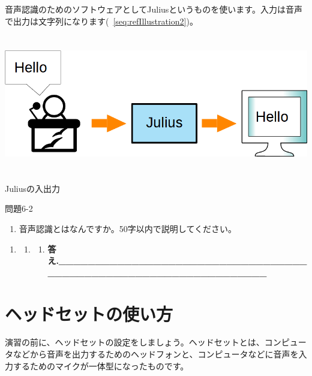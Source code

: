 \documentclass[a4paper,dvipdfmx]{jarticle}
\newcommand\liststyleLii{%
\renewcommand\theenumi{\arabic{enumi}}
\renewcommand\theenumii{\arabic{enumii}}
\renewcommand\theenumiii{\arabic{enumiii}}
\renewcommand\theenumiv{\arabic{enumiv}}
\renewcommand\labelenumi{\theenumi.}
\renewcommand\labelenumii{\theenumii.}
\renewcommand\labelenumiii{\theenumiii.}
\renewcommand\labelenumiv{\theenumiv.}
}
\newcommand\liststyleLiii{%
\renewcommand\theenumi{\arabic{enumi}}
\renewcommand\theenumii{\arabic{enumii}}
\renewcommand\theenumiii{\arabic{enumiii}}
\renewcommand\theenumiv{\arabic{enumiv}}
\renewcommand\labelenumi{\theenumi.}
\renewcommand\labelenumii{\theenumii.}
\renewcommand\labelenumiii{\theenumiii.}
\renewcommand\labelenumiv{\theenumiv.}
}
\begin{document}
{
音声認識のためのソフトウェアとしてJuliusというものを使います。入力は音声で出力は文字列になります(\figurename~\ref{seq:refIllustration2})。}



\centering
\includegraphics[width=17.006cm,height=6.006cm]{text06-img/text06-img002.png}
\caption[Juliusの入出力]{\newline
Juliusの入出力}
\label{seq:refIllustration2}

{
問題6-2}

\liststyleLiii
\begin{enumerate}
\item {
音声認識とはなんですか。50字以内で説明してください。}
\end{enumerate}
\liststyleLii
\begin{enumerate}
\item[] 
\bigskip

\begin{enumerate}
\item \begin{enumerate}
\item[] {\raggedleft\ttfamily\bfseries
答え.\_\_\_\_\_\_\_\_\_\_\_\_\_\_\_\_\_\_\_\_\_\_\_\_\_\_\_\_\_\_\_\_\_\_\_\_\_\_\_\_\_\_\_\_\_\_\_\_\_\_\_\_\_\_\_\_\_\_\_\_\_\_\_\_
\par}
\end{enumerate}
\end{enumerate}
\end{enumerate}

\bigskip

\section{ヘッドセットの使い方}
{
演習の前に、ヘッドセットの設定をしましょう。ヘッドセットとは、コンピュータなどから音声を出力するためのヘッドフォンと、コンピュータなどに音声を入力するためのマイクが一体型になったものです。}
\end{document}
